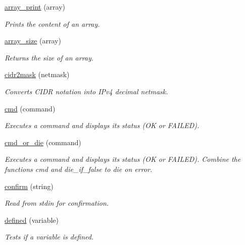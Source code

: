 \begin{DoxyCompactItemize}
\hyperlink{group__array_gabeb6fdf4a20b660e7690df808ed1a213}{array\+\_\+print} (array)
\begin{DoxyCompactList}\small\item\em Prints the content of an array. \end{DoxyCompactList}\item 
\hyperlink{group__array_ga06f72437a7b990eca354502b6c628bb9}{array\+\_\+size} (array)
\begin{DoxyCompactList}\small\item\em Returns the size of an array. \end{DoxyCompactList}\item 
\hyperlink{group__network_ga29eb87466a05fafa3923b9eebd5448fe}{cidr2mask} (netmask)
\begin{DoxyCompactList}\small\item\em Converts C\+I\+DR notation into I\+Pv4 decimal netmask. \end{DoxyCompactList}\item 
\hyperlink{group__command_ga9d48c63ba9b6d46e9d60ae5f4c2f0446}{cmd} (command)
\begin{DoxyCompactList}\small\item\em Executes a command and displays its status (\textquotesingle{}OK\textquotesingle{} or \textquotesingle{}F\+A\+I\+L\+ED\textquotesingle{}). \end{DoxyCompactList}\item 
\hyperlink{group__command_ga11d55e4afce37b27eb723d25fd4bf00e}{cmd\+\_\+or\+\_\+die} (command)
\begin{DoxyCompactList}\small\item\em Executes a command and displays its status (\textquotesingle{}OK\textquotesingle{} or \textquotesingle{}F\+A\+I\+L\+ED\textquotesingle{}). Combine the functions {\ttfamily cmd} and {\ttfamily die\+\_\+if\+\_\+false} to die on error. \end{DoxyCompactList}\item 
\hyperlink{group__stdin_gab3340d7b2aa97133190861db32e53f7a}{confirm} (string)
\begin{DoxyCompactList}\small\item\em Read from stdin for confirmation. \end{DoxyCompactList}\item 
\hyperlink{group__variable_ga956e988b821bf93dde52117a3f881036}{defined} (variable)
\begin{DoxyCompactList}\small\item\em Tests if a variable is defined. \end{DoxyCompactList}\item 

\end{DoxyCompactItemize}
